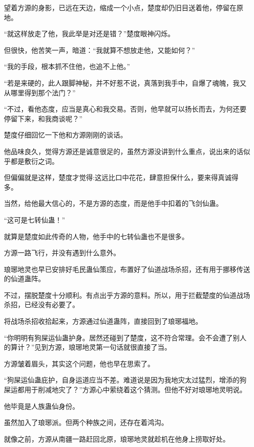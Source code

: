 
\begin{this_body}

望着方源的身影，已远在天边，缩成一个小点，楚度却仍旧目送着他，停留在原地。

“就这样放走了他，我此举是对还是错？”楚度眼神闪烁。

但很快，他苦笑一声，暗道：“我就算不想放走他，又能如何？”

“我的手段，根本抓不住他，也追不上他。”

“若是来硬的，此人跟脚神秘，并不好惹不说，真落到我手中，自爆了魂魄，我又从哪里得到那个法门？”

“不过，看他态度，应当是真心和我交易。否则，他早就可以扬长而去，为何还要停留下来，和我商谈呢？”

楚度仔细回忆一下他和方源刚刚的谈话。

他品味良久，觉得方源还是诚意很足的，虽然方源没讲到什么重点，说出来的话似乎都是敷衍之词。

但偏偏就是这样，楚度才觉得:这远比口中花花，肆意担保什么，要来得真诚得多。

当然，给他最大信心的，不是方源的态度，而是他手中扣着的飞剑仙蛊。

“这可是七转仙蛊！”

就算是楚度如此传奇的人物，他手中的七转仙蛊也不是很多。

方源一路飞行，并没有遇到什么意外。

琅琊地灵也早已安排好毛民蛊仙策应，布置好了仙道战场杀招，还有用于挪移传送的仙道蛊阵。

不过，摆脱楚度十分顺利。有点出乎方源的意料。所以，用于拦截楚度的仙道战场杀招，已经没有必要了。

将战场杀招收拾起来，方源通过仙道蛊阵，直接回到了琅琊福地。

“你明明有狗屎运仙蛊护身。居然还碰到了楚度，这不符合常理。会不会遭了别人的算计？”见到方源，琅琊地灵第一句话就很直接了当。

方源皱着眉头，其实这个问题，他也早在思索了。

“狗屎运仙蛊庇护，自身运道应当不差。难道说是因为我地灾太过猛烈，增添的狗屎运都用于削减地灾了？”方源心中萦绕着这个猜测。但他不好对琅琊地灵明说。

他毕竟是人族蛊仙身份。

虽然加入了琅琊派。但两个种族之间，还存在着鸿沟。

就像之前，方源从南疆一路赶回北原，琅琊地灵就趁机在他身上捞取好处。


\end{this_body}
